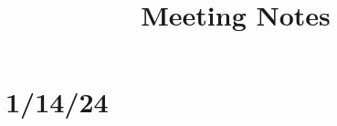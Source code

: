 \documentclass[11pt]{article}
\title{Meeting Notes}
\author{}
\date{}
\begin{document}
\maketitle

\tableofcontents

\section{1/14/24}
\end{document}
